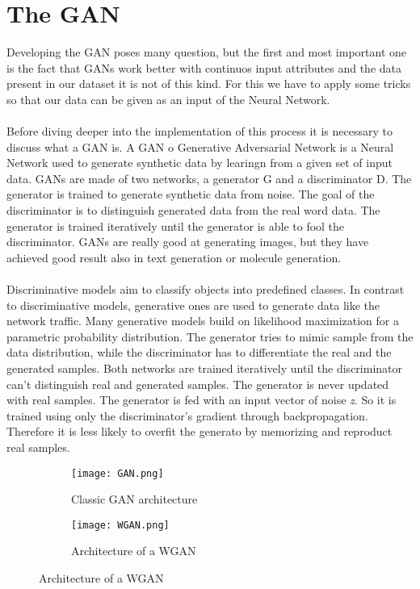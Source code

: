 \chapter{The GAN}
Developing the GAN poses many question, but the first and most important one is the fact that GANs work better
with continuos input attributes and the data present in our dataset it is not of this kind. For this we have
to apply some tricks so that our data can be given as an input of the Neural Network.
\\\\
Before diving deeper into the implementation of this process it is necessary to discuss what a GAN is.
A GAN o Generative Adversarial Network is a Neural Network used to generate synthetic data by learingn from a
given set of input data. GANs are made of two networks, a generator G and a discriminator D. The generator 
is trained to generate synthetic data from noise. The goal of the discriminator is to distinguish generated 
data from the real word data. The generator is trained iteratively until the generator is able to fool the
discriminator. GANs are really good at generating images, but they have achieved good result also in text
generation or molecule generation.
\\\\
Discriminative models aim to classify objects into predefined classes. In contrast to discriminative models, 
generative ones are used to generate data like the network traffic. Many generative models build on likelihood
maximization for a parametric probability distribution. The generator tries to mimic sample from the data 
distribution, while the discriminator has to differentiate the real and the generated samples.
Both networks are trained iteratively until the discriminator can't distinguish real and generated samples. 
The generator is never updated with real samples. The generator is fed with an input vector of noise 
\textit{z}. So it is trained using only the discriminator's gradient through backpropagation. 
Therefore it is less likely to overfit the generato by memorizing and reproduct real samples.
\begin{figure}[h]
    \centering
    \begin{subfigure}{.45\textwidth}
        \centering
        \texttt{[image: GAN.png]}  
        \caption{Classic GAN architecture}
    \end{subfigure}
    \begin{subfigure}{.45\textwidth}
        \centering
        \texttt{[image: WGAN.png]}  
        \caption{Architecture of a WGAN}
    \end{subfigure}
    \label{Architecture differences}
\end{figure}
